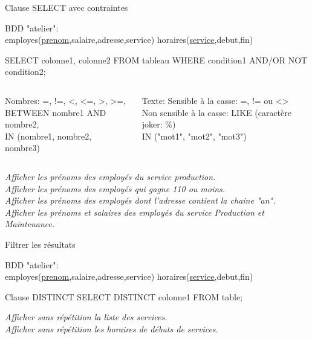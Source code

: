 \documentclass[xetex,dvipsnames]{beamer}
\begin{document}
\begin{frame}[t]{Clause SELECT avec contraintes}
\begin{small}
		BDD "atelier": \\employes(\underline{prenom},salaire,adresse,service) horaires(\underline{service},debut,fin)
\end{small}	\begin{alertblock}{}
		SELECT colonne1, colonne2 FROM tableau WHERE condition1 AND/OR NOT condition2;
	\end{alertblock}
	
\begin{footnotesize}
 \begin{columns}
    \begin{column}{0.5\textwidth}
	\begin{block}{Nombres:}
		=, !=, <, <=, >, >=,
		\\BETWEEN nombre1 AND nombre2,
		\\IN (nombre1, nombre2, nombre3)
	\end{block}
	    \end{column}
	    \begin{column}{0.5\textwidth}
		\begin{block}{Texte:}
Sensible à la casse: =, != ou <> 
\\Non sensible à la casse: LIKE (caractère joker: \%)
\\IN ("mot1", "mot2", "mot3")
	\end{block}
		    \end{column}
	    \end{columns}

\end{footnotesize}
		\textit{Afficher les prénoms des employés du service production.}\\
		\textit{Afficher les prénoms des employés qui gagne 110 ou moins.}\\
		\textit{Afficher les prénoms des employés dont l'adresse contient la chaine "an".}\\
		\textit{Afficher les prénoms et salaires des employés du service Production et Maintenance.}\\
\end{frame}


\begin{frame}[t]{Filtrer les résultats}
\begin{small}
		BDD "atelier": \\employes(\underline{prenom},salaire,adresse,service) horaires(\underline{service},debut,fin)
\end{small}	
	\begin{alertblock}{Clause DISTINCT}
		SELECT DISTINCT colonne1 FROM table;
	\end{alertblock}
	
		\textit{Afficher sans répétition la liste des services.}\\
		\textit{Afficher sans répétition les horaires de débuts de services.}\\
\end{frame}
\end{document}
